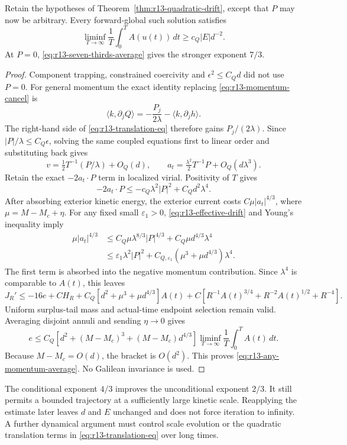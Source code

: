\begin{theorem}
\label{thm:r13-any-momentum}
Retain the hypotheses of Theorem~\ref{thm:r13-quadratic-drift}, except
that $P$ may now be arbitrary. Every forward-global such solution
satisfies
\begin{equation}\label{eq:r13-any-momentum-average}
 \liminf_{T\to\infty}\frac1T\int_0^T A(u(t))\,dt
 \ge c_Q|E|d^{-2}.
\end{equation}
At $P=0$, \eqref{eq:r13-seven-thirds-average} gives the stronger
exponent $7/3$.
\end{theorem}
\begin{proof}
Component trapping, constrained coercivity and
$\epsilon^2\le C_Qd$ did not use $P=0$. For general momentum the
exact identity replacing \eqref{eq:r13-momentum-cancel} is
\[
 \langle k,\partial_jQ\rangle
 =-\frac{P_j}{2\lambda}-\langle k,\partial_jh\rangle.
\]
The right-hand side of \eqref{eq:r13-translation-eq} therefore gains
$P_j/(2\lambda)$. Since $|P|/\lambda\le C_Q\epsilon$, solving the
same coupled equations first to linear order and substituting back
gives
\begin{equation}\label{eq:r13-effective-drift}
 v=\tfrac12T^{-1}(P/\lambda)+O_Q(d),\qquad
 a_t=\tfrac{\lambda^2}{2}T^{-1}P+O_Q(d\lambda^3).
\end{equation}
Retain the exact $-2a_t\cdot P$ term in localized virial. Positivity
of $T$ gives
\[
 -2a_t\cdot P\le-c_Q\lambda^2|P|^2+C_Qd^2\lambda^4.
\]
After absorbing exterior kinetic energy, the exterior current costs
$C\mu|a_t|^{4/3}$, where $\mu=M-M_c+\eta$. For any fixed small
$\varepsilon_1>0$, \eqref{eq:r13-effective-drift} and Young's
inequality imply
\begin{align*}
 \mu|a_t|^{4/3}
 &\le C_Q\mu\lambda^{8/3}|P|^{4/3}
       +C_Q\mu d^{4/3}\lambda^4\\
 &\le\varepsilon_1\lambda^2|P|^2
       +C_{Q,\varepsilon_1}(\mu^3+\mu d^{4/3})\lambda^4.
\end{align*}
The first term is absorbed into the negative momentum contribution.
Since $\lambda^4$ is comparable to $A(t)$, this leaves
\[
 J_R'\le-16e+CH_R
   +C_Q[d^2+\mu^3+\mu d^{4/3}]A(t)
   +C[R^{-1}A(t)^{3/4}+R^{-2}A(t)^{1/2}+R^{-4}].
\]
Uniform surplus-tail mass and actual-time endpoint selection remain
valid. Averaging disjoint annuli and sending $\eta\to0$ gives
\[
 e\le C_Q[d^2+(M-M_c)^3+(M-M_c)d^{4/3}]
       \liminf_{T\to\infty}\frac1T\int_0^T A(t)\,dt.
\]
Because $M-M_c=O(d)$, the bracket is $O(d^2)$. This proves
\eqref{eq:r13-any-momentum-average}. No Galilean invariance is used.
\end{proof}

The conditional exponent $4/3$ improves the unconditional exponent
$2/3$. It still permits a bounded trajectory at a sufficiently large
kinetic scale. Reapplying the estimate later leaves $d$ and $E$
unchanged and does not force iteration to infinity. A further dynamical
argument must control scale evolution or the quadratic translation
terms in \eqref{eq:r13-translation-eq} over long times.
